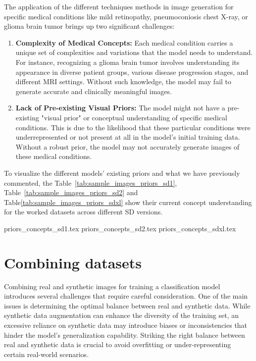 The application of the different techniques methods in image generation for specific medical conditions like mild retinopathy, pneumoconiosis chest X-ray, or glioma brain tumor brings up two significant challenges:

\begin{enumerate}
    \item \textbf{Complexity of Medical Concepts:} Each medical condition carries a unique set of complexities and variations that the model needs to understand. For instance, recognizing a glioma brain tumor involves understanding its appearance in diverse patient groups, various disease progression stages, and different MRI settings. Without such knowledge, the model may fail to generate accurate and clinically meaningful images.

    \item \textbf{Lack of Pre-existing Visual Priors:} The model might not have a pre-existing "visual prior" or conceptual understanding of specific medical conditions. This is due to the likelihood that these particular conditions were underrepresented or not present at all in the model's initial training data. Without a robust prior, the model may not accurately generate images of these medical conditions.
\end{enumerate}

To visualize the different models' existing priors and what we have previously commented, the Table~\ref{tab:sample_images_priors_sd1}, Table~\ref{tab:sample_images_priors_sd2} and Table\ref{tab:sample_images_priors_sdxl} show their current concept understanding for the worked datasets across different SD versions.

{priors_concepts_sd1.tex}
{priors_concepts_sd2.tex}
{priors_concepts_sdxl.tex}

\section{Combining datasets}

Combining real and synthetic images for training a classification model introduces several challenges that require careful consideration. One of the main issues is determining the optimal balance between real and synthetic data. While synthetic data augmentation can enhance the diversity of the training set, an excessive reliance on synthetic data may introduce biases or inconsistencies that hinder the model's generalization capability. Striking the right balance between real and synthetic data is crucial to avoid overfitting or under-representing certain real-world scenarios.

